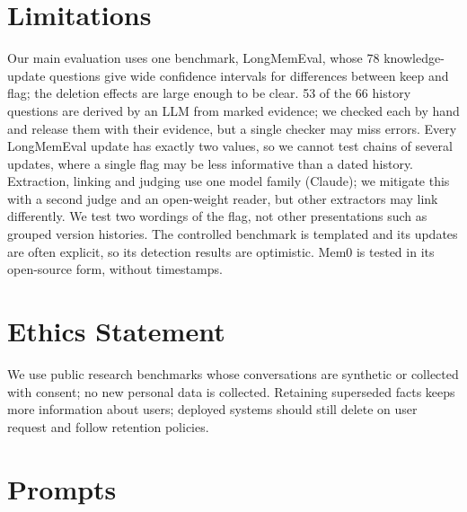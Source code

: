 \documentclass[11pt]{article}
\begin{document}
\section*{Limitations}

Our main evaluation uses one benchmark, LongMemEval, whose 78 knowledge-update questions give wide
confidence intervals for differences between keep and flag; the deletion effects are large enough to
be clear. 53 of the 66 history questions are derived by an LLM from marked evidence; we checked each by hand
and release them with their evidence, but a single checker may miss errors. Every LongMemEval update has exactly two
values, so we cannot test chains of several updates, where a single flag may be less informative than
a dated history. Extraction, linking and judging use one model family (Claude); we mitigate this with
a second judge and an open-weight reader, but other extractors may link differently. We test two
wordings of the flag, not other presentations such as grouped version histories. The controlled benchmark
is templated and its updates are often explicit, so its detection results are optimistic. Mem0 is
tested in its open-source form, without timestamps.

\section*{Ethics Statement}

We use public research benchmarks whose conversations are synthetic or collected with consent; no
new personal data is collected. Retaining superseded facts keeps more information about users;
deployed systems should still delete on user request and follow retention policies.



\appendix

\section{Prompts}
\label{app:prompts}
\end{document}
